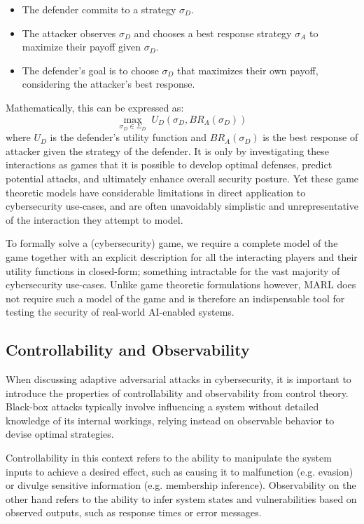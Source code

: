 \begin{itemize}
    \item The defender commits to a strategy $\sigma_D$.
    \item The attacker observes $\sigma_D$ and chooses a best response strategy $\sigma_A$ to maximize their payoff given $\sigma_D$.
    \item The defender's goal is to choose $\sigma_D$ that maximizes their own payoff, considering the attacker's best response.
\end{itemize}

Mathematically, this can be expressed as:
\[
\max_{\sigma_D \in \Sigma_D} \; U_D(\sigma_D, BR_A(\sigma_D))
\]
where $U_D$ is the defender's utility function and $BR_A(\sigma_D)$ is the best response of attacker given the strategy of the defender.
It is only by investigating these interactions as games that it is possible to develop optimal defenses, predict potential attacks, and ultimately enhance overall security posture.
Yet these game theoretic models have considerable limitations in direct application to cybersecurity use-cases, and are often unavoidably simplistic and unrepresentative of the interaction they attempt to model.

To formally solve a (cybersecurity) game, we require a complete model of the game together with an explicit description for all the interacting players and their utility functions in closed-form; something intractable for the vast majority of cybersecurity use-cases.
Unlike game theoretic formulations however, \gls{MARL} does not require such a model of the game and is therefore an indispensable tool for testing the security of real-world AI-enabled systems.

\subsection{Controllability and Observability}
\label{sec:control}

When discussing adaptive adversarial attacks in cybersecurity, it is important to introduce the properties of controllability and observability from control theory.
Black-box attacks typically involve influencing a system without detailed knowledge of its internal workings, relying instead on observable behavior to devise optimal strategies.

Controllability in this context refers to the ability to manipulate the system inputs to achieve a desired effect, such as causing it to malfunction (e.g. evasion) or divulge sensitive information (e.g. membership inference).
Observability on the other hand refers to the ability to infer system states and vulnerabilities based on observed outputs, such as response times or error messages.

